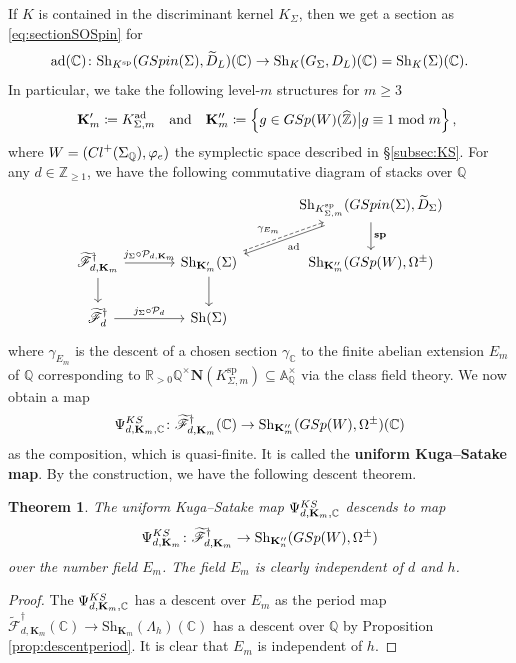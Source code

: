 \documentclass[11pt,reqno,oneside]{amsart}
\numberwithin{equation}{section}
\newtheorem{theorem}{Theorem}[section]
\theoremstyle{definition}
\DeclareMathOperator{\ad}{ad}
\newcommand{\Cl}{{\rm Cl}}
\newcommand{\KS}{{\rm KS}}
\newcommand{\GSpin}{{\rm GSpin}}
\newcommand{\GSp}{{\rm GSp}}
\newcommand{\Sh}{\mathrm{Sh}}
\newcommand{\scF}{\mathscr{F}}
\newcommand\spin{{\bf sp}}
\newcommand{\CC}{\mathbb{C}}
\newcommand{\QQ}{\mathbb{Q}}
\newcommand{\RR}{\mathbb{R}}
\newcommand{\ZZ}{\mathbb{Z}}
\begin{document}
If $K$ is contained in the discriminant kernel $K_{\Sigma}$, then we get a section as \eqref{eq:sectionSOSpin} for
\[
\ad(\CC) \colon\Sh_{K^{\operatorname{sp}}}(\GSpin(\Sigma), \widetilde{D}_L)(\CC) \to \Sh_{K}(G_{\Sigma}, D_{L})(\CC) =\Sh_K(\Sigma)(\CC).
\]
In particular, we take the following level-$m$ structures for $m \geq 3$
\begin{equation}\label{eq:conven}
 \quad  \mathbf{K}'_m\coloneqq K_{\Sigma, m}^{\ad}\quad \text{and}\quad \mathbf{K}_m'' \coloneqq \left\{g \in \GSp(W)(\widehat{\ZZ})\big| g \equiv 1 \bmod m\right\},
\end{equation}
where $W= (\Cl^+(\Sigma_{\QQ}), \varphi_e)$ the symplectic space described in \S \ref{subsec:KS}.  For any $d \in \ZZ_{\geq 1}$, we have the following commutative diagram of stacks over $\QQ$
\begin{equation}\label{eq:bigdiag}
\begin{tikzcd}[column sep= large]
& & \Sh_{K^{\operatorname{sp}}_{\Sigma,m}}(\GSpin(\Sigma), \widetilde{D}_{\Sigma}) \ar[d,"\spin"] \ar[ld, shift left,"\ad"] \\
\widetilde{\scF}^{\dag}_{d,\mathbf{K}_{m}} \ar[d] \ar[r,"j_{\Sigma} \circ \mathcal{P}_{d,\mathbf{K}_m}"]& \Sh_{\mathbf{K}'_{m}}(\Sigma) \ar[d] \ar[ru, "\gamma_{E_m}",dashed] & \Sh_{\mathbf{K}''_m}(\GSp(W), \Omega^{\pm})\\
\widetilde{\scF}_{d}^{\dag} \ar[r,"j_{\Sigma} \circ \mathcal{P}_d"] & \Sh(\Sigma)
\end{tikzcd}
\end{equation}
where $\gamma_{E_m}$ is the descent of a chosen section $\gamma_{\CC}$ to the finite abelian extension $E_m$ of $\QQ$ corresponding to $\RR_{>0} \QQ^{\times} \mathbf{N}(K^{\operatorname{sp}}_{\Sigma,m}) \subseteq \mathbb{A}_{\QQ}^{\times}$ via the class field theory. We now obtain a map
\begin{equation}
\Psi_{d,\mathbf{K}_m,\CC}^{\KS}\colon \widetilde{\scF}_{d,\mathbf{K}_{m}}^\dag (\CC)\rightarrow  \Sh_{\mathbf{K}''_m}(\GSp(W), \Omega^{\pm})(\CC)
\end{equation}
as the composition, which is quasi-finite. It is called the \textbf{uniform Kuga--Satake map}. By the construction, we have the following descent theorem. 
\begin{theorem}\label{thm:descentKuga}
The uniform  Kuga--Satake map  $\Psi^{\KS}_{d,\mathbf{K}_m,\CC}$
descends to  map 
\[
\Psi^{\KS}_{d,\mathbf{K}_m}\colon \widetilde{\scF}^{\dag}_{d,\mathbf{K}_{m}} \to \Sh_{\mathbf{K}''_n}(\GSp(W), \Omega^{\pm})\]
over the number field $E_m$. The field $E_m$ is clearly independent of $d$ and $h$.   
\end{theorem}
\begin{proof}
The $\Psi_{d,\mathbf{K}_m,\CC}^{\KS}$ has a descent over $E_m$ as the period map $\widetilde{\scF}_{d, \mathbf{K}_{m}}^{\dag}(\CC) \to \Sh_{\mathbf{K}_{m}}(\Lambda_h)(\CC)$ has a descent over $\QQ$ by Proposition \ref{prop:descentperiod}. It is clear that $E_m$ is independent of $h$. 
\end{proof}
\end{document}
